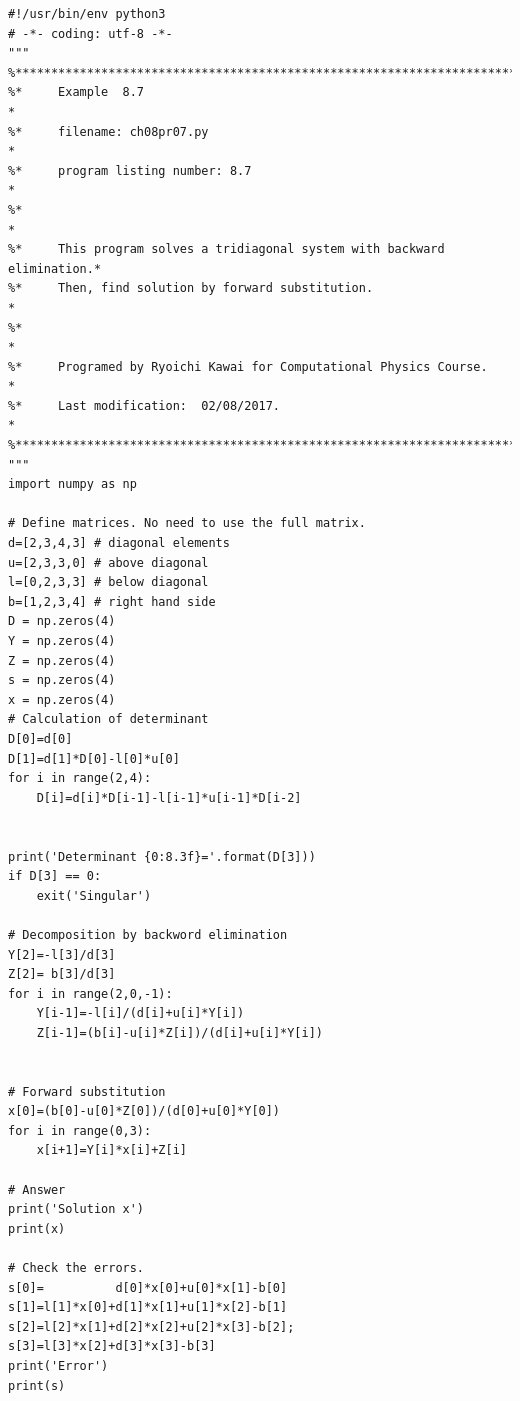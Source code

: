 \bigskip
\noindent
\program
\footnotesize
\begin{verbatim}
#!/usr/bin/env python3
# -*- coding: utf-8 -*-
"""
%**************************************************************************
%*     Example  8.7                                                       *
%*     filename: ch08pr07.py                                              *
%*     program listing number: 8.7                                        *
%*                                                                        *
%*     This program solves a tridiagonal system with backward elimination.*
%*     Then, find solution by forward substitution.                       *
%*                                                                        *
%*     Programed by Ryoichi Kawai for Computational Physics Course.       *
%*     Last modification:  02/08/2017.                                    *
%**************************************************************************
"""
import numpy as np

# Define matrices. No need to use the full matrix.
d=[2,3,4,3] # diagonal elements
u=[2,3,3,0] # above diagonal
l=[0,2,3,3] # below diagonal
b=[1,2,3,4] # right hand side
D = np.zeros(4)
Y = np.zeros(4)
Z = np.zeros(4)
s = np.zeros(4)
x = np.zeros(4)
# Calculation of determinant
D[0]=d[0]
D[1]=d[1]*D[0]-l[0]*u[0]
for i in range(2,4):
    D[i]=d[i]*D[i-1]-l[i-1]*u[i-1]*D[i-2]


print('Determinant {0:8.3f}='.format(D[3]))
if D[3] == 0:
    exit('Singular')

# Decomposition by backword elimination
Y[2]=-l[3]/d[3]
Z[2]= b[3]/d[3]
for i in range(2,0,-1):
    Y[i-1]=-l[i]/(d[i]+u[i]*Y[i])
    Z[i-1]=(b[i]-u[i]*Z[i])/(d[i]+u[i]*Y[i])


# Forward substitution
x[0]=(b[0]-u[0]*Z[0])/(d[0]+u[0]*Y[0])
for i in range(0,3):
    x[i+1]=Y[i]*x[i]+Z[i]

# Answer
print('Solution x')
print(x)

# Check the errors. 
s[0]=          d[0]*x[0]+u[0]*x[1]-b[0]
s[1]=l[1]*x[0]+d[1]*x[1]+u[1]*x[2]-b[1]
s[2]=l[2]*x[1]+d[2]*x[2]+u[2]*x[3]-b[2];
s[3]=l[3]*x[2]+d[3]*x[3]-b[3]
print('Error')
print(s)
\end{verbatim}


